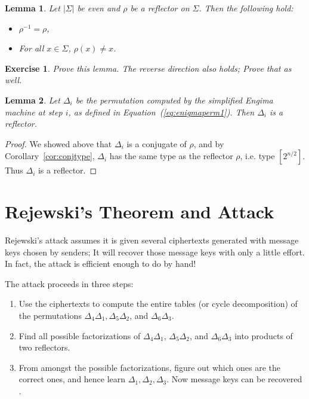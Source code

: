 \documentclass[11pt]{article}
\newtheorem{exercise}{Exercise}
\newtheorem{lemma}{Lemma}
\begin{document}
\begin{lemma}
    Let $|\Sigma|$ be even and $\rho$ be a reflector on $\Sigma$.
    Then the following hold:
    \begin{itemize}
        \item $\rho^{-1}=\rho$,
        \item For all $x\in\Sigma$, $\rho(x)\neq x$.
    \end{itemize}
\end{lemma}
    \begin{exercise} Prove this lemma. The reverse direction also holds; Prove that as well.
    \end{exercise}

\begin{lemma}\label{lem:deltarefl}
    Let $\Delta_i$ be the permutation computed by the simplified Engima machine
    at step $i$, as defined in Equation~(\ref{eq:enigmaperm1}). Then $\Delta_i$
    is a reflector.
\end{lemma}
\begin{proof}
    We showed above that $\Delta_i$ is a conjugate of $\rho$, and by
    Corollary~\ref{cor:conjtype}, $\Delta_i$ has the same type as the reflector
    $\rho$, i.e. type $[2^{n/2}]$.  Thus $\Delta_i$ is a reflector.
\end{proof}

\section{Rejewski's Theorem and Attack}

Rejewski's attack assumes it is given several ciphertexts generated with
message keys chosen by senders; It will recover those message keys with only a
little effort. In fact, the attack is efficient enough to do by hand!

The attack proceeds in three steps:
\begin{enumerate}

    \item Use the ciphertexts to compute the entire tables (or cycle
        decomposition) of the permutations $\Delta_4\Delta_1,\Delta_5\Delta_2$,
        and $\Delta_6\Delta_3$.
    \item Find all possible factorizations of $\Delta_4\Delta_1$,
        $\Delta_5\Delta_2$, and $\Delta_6\Delta_3$ into products of two
        reflectors.
    \item From amongst the possible factorizations, figure out which
        ones are the correct ones, and hence learn $\Delta_1,\Delta_2,\Delta_3$.
        Now message keys can be recovered .
\end{enumerate}
\end{document}
